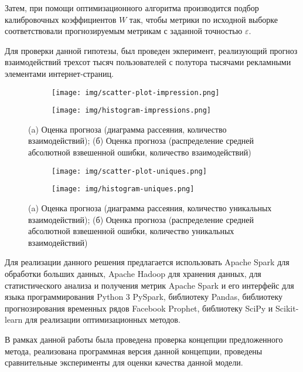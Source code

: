 \documentclass[a4paper, 12pt]{extreport}
\begin{document}
    Затем, при помощи оптимизационного алгоритма производится подбор калибровочных коэффициентов $W$ так, чтобы
    метрики по исходной выборке соответствовали прогнозируемым метрикам с заданной точностью $\varepsilon$.

    Для проверки данной гипотезы, был проведен экперимент, реализующий прогноз взаимодействий трехсот тысяч пользователей
    с полутора тысячами рекламными элементами интернет-страниц.

    \begin{figure}[ht]
        \centering
        \begin{subfigure}[b]{0.4\textwidth}
            \centering
            \texttt{[image: img/scatter-plot-impression.png]}
            \caption{}
        \end{subfigure} %
        \begin{subfigure}[b]{0.4\textwidth}
            \centering
            \texttt{[image: img/histogram-impressions.png]}
            \caption{}
        \end{subfigure}
        \caption{(a) Оценка прогноза (диаграмма рассеяния, количество взаимодействий);
        (б) Оценка прогноза (распределение средней абсолютной взвешенной ошибки, количество взаимодействий)}
    \end{figure}

    \begin{figure}[ht]
        \centering
        \begin{subfigure}[b]{0.4\textwidth}
            \centering
            \texttt{[image: img/scatter-plot-uniques.png]}
            \caption{}
        \end{subfigure} %
        \begin{subfigure}[b]{0.4\textwidth}
            \centering
            \texttt{[image: img/histogram-uniques.png]}
            \caption{}
        \end{subfigure}
        \caption{(a) Оценка прогноза (диаграмма рассеяния, количество уникальных взаимодействий);
        (б) Оценка прогноза (распределение средней абсолютной взвешенной ошибки, количество уникальных взаимодействий)}
    \end{figure}

    Для реализации данного решения предлагается использовать Apache Spark для обработки больших данных, Apache Hadoop
    для хранения данных, для статистического анализа и получения метрик Apache Spark и его интерфейс для языка
    программирования Python 3 PySpark, библиотеку Pandas, библиотеку прогнозирования временных рядов Facebook Prophet,
    библиотеку SciPy и Scikit-learn для реализации оптимизационных методов.

    В рамках данной работы была проведена проверка концепции предложенного метода, реализована программная версия
    данной концепции, проведены сравнительные эксперименты для оценки качества данной модели.
\end{document}
